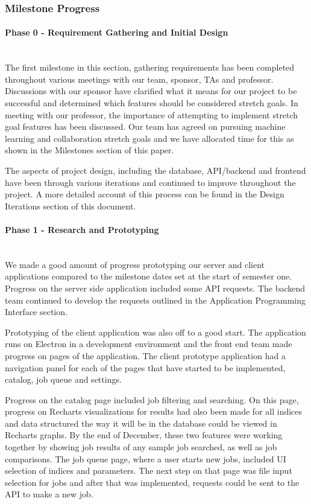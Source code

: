 \subsubsection{Milestone Progress}
\paragraph{Phase 0 - Requirement Gathering and Initial Design} \mbox{}\\[\paragraphheaderspace]
The first milestone in this section, gathering requirements has been completed throughout various meetings with our team, sponsor, TAs and professor. Discussions with our sponsor have clarified what it means for our project to be successful and determined which features should be considered stretch goals. In meeting with our professor, the importance of attempting to implement stretch goal features has been discussed. Our team has agreed on pursuing machine learning  and collaboration stretch goals and we have allocated time for this as shown in the Milestones section of this paper.\par
The aspects of project design, including the database, API/backend and frontend have been through various iterations and continued to improve throughout the project. A more detailed account of this process can be found in the Design Iterations section of this document.\par
\paragraph{Phase 1 - Research and Prototyping} \mbox{}\\[\paragraphheaderspace]
We made a good amount of progress prototyping our server and client applications compared to the milestone dates set at the start of semester one. Progress on the server side application included some API requests. The backend team continued to develop the requests outlined in the Application Programming Interface section.\par
Prototyping of the client application was also off to a good start. The application runs on Electron in a development environment and the front end team made progress on pages of the application. The client prototype application had a navigation panel for each of the pages that have started to be implemented, catalog, job queue and settings.\par
Progress on the catalog page included job filtering and searching. On this page, progress on Recharts visualizations for results had also been made for all indices and data structured the way it will be in the database could be viewed in Recharts graphs. By the end of December, these two features were working together by showing job results of any sample job searched, as well as job comparisons. The job queue page, where a user starts new jobs, included UI selection of indices and parameters. The next step on that page was file input selection for jobs and after that was implemented, requests could be sent to the API to make a new job.\par

